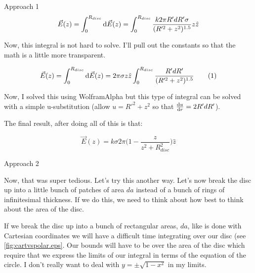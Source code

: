 \begin{homeworkProblem}
\begin{homeworkSection}{Approach 1}
        \[ \vec{E}(z) = \int_0^{R_{disc}} \mathop{}\!\mathrm{d} \vec{E}(z) =
        \int_0^{R_{disc}}\frac{k 2 \pi R' dR' \sigma}{(R'^2+z^2)^{1.5}}
        z\hat{z} \]

        Now, this integral is not hard to solve. I'll pull out the
        constants so that the math is a little more transparent. 
        
        \[ \vec{E}(z) = \int_0^{R_{disc}} \mathop{}\!\mathrm{d} \vec{E}(z) =
        2\pi \sigma z \hat{z} \int_0^{R_{disc}}\frac{R' dR'
        }{(R'^2+z^2)^{1.5}} \tag{1} \]
        
        Now, I solved this using WolframAlpha but this type of integral
        can be solved with a simple u-substitution (allow $u = R'^2 +
        z^2$ so that $\frac{\mathop{}\!\mathrm{d} u}{\mathop{}\!\mathrm{d} r} = 2 R' dR'$).

        The final result, after doing all of this is that:

        \[ \vec{E}(z) = k\sigma 2\pi \bigg( 1 - \frac{z}{z^2+R_{disc}^2}
        \bigg)\hat{z} \]



        
        \end{homeworkSection}
    
    \begin{homeworkSection}{Approach 2}

        Now, that was super tedious. Let's try this another way. Let's
        now break the disc up into a little bunch of patches of area
        $da$ instead of a bunch of rings of infinitesimal thickness. If
        we do this, we need to think about how best to think about the
        area of the disc.
        
        If we break the disc up into a bunch of
        rectangular areas, $da$, like is done with Cartesian coordinates
        we will have a difficult time integrating over our disc (see
        \ref{fig:cartvspolar.eps}. Our bounds will have to be over the 
				area of the disc which
        require that we express the limits of our integral in terms of
        the equation of the circle. I don't really want to deal with $y
        = \pm \sqrt{1-x^2}$ in my limits.


\end{homeworkSection}
\end{homeworkProblem}
